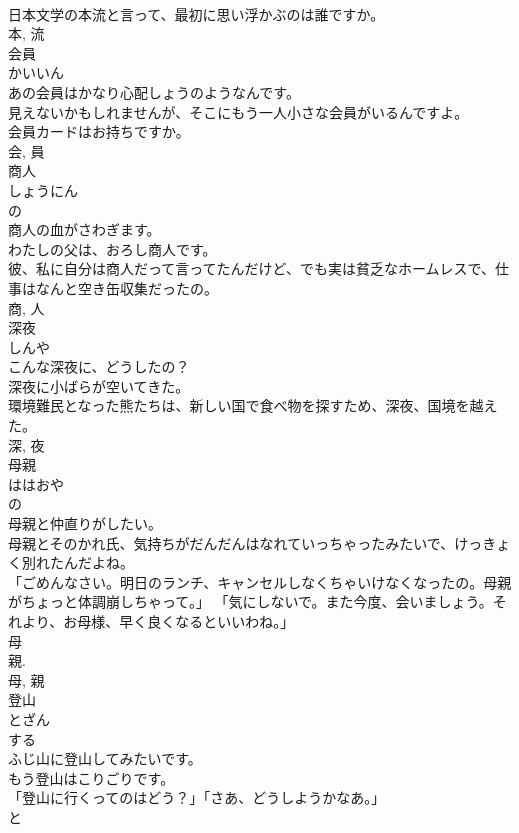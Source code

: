 \documentclass[8pt]{extreport}
\begin{document}
\begin{CJK}{UTF8}{min}
\\	日本文学の本流と言って、最初に思い浮かぶのは誰ですか。	
\\	本, 流	
\\	会員	
\\	かいいん	
\\	あの会員はかなり心配しょうのようなんです。	
\\	見えないかもしれませんが、そこにもう一人小さな会員がいるんですよ。	
\\	会員カードはお持ちですか。	
\\	会, 員	
\\	商人	
\\	しょうにん	
\\	の 
\\	商人の血がさわぎます。	
\\	わたしの父は、おろし商人です。	
\\	彼、私に自分は商人だって言ってたんだけど、でも実は貧乏なホームレスで、仕事はなんと空き缶収集だったの。	
\\	商, 人	
\\	深夜	
\\	しんや	
\\	こんな深夜に、どうしたの？	
\\	深夜に小ばらが空いてきた。	
\\	環境難民となった熊たちは、新しい国で食べ物を探すため、深夜、国境を越えた。	
\\	深, 夜	
\\	母親	
\\	ははおや	
\\	の 
\\	母親と仲直りがしたい。	
\\	母親とそのかれ氏、気持ちがだんだんはなれていっちゃったみたいで、けっきょく別れたんだよね。	
\\	「ごめんなさい。明日のランチ、キャンセルしなくちゃいけなくなったの。母親がちょっと体調崩しちゃって。」 「気にしないで。また今度、会いましょう。それより、お母様、早く良くなるといいわね。」	
\\	母 
\\	親. 
\\	母, 親	
\\	登山	
\\	とざん	
\\	する 
\\	ふじ山に登山してみたいです。	
\\	もう登山はこりごりです。	
\\	「登山に行くってのはどう？」「さあ、どうしようかなあ。」	
\\	と 

\end{CJK}
\end{document}
